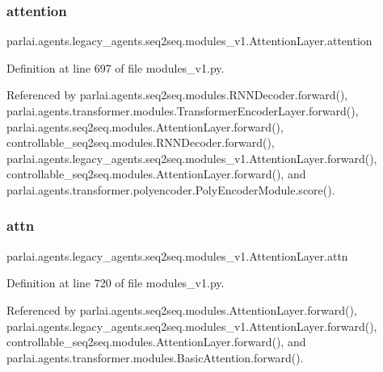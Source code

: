 \subsubsection{\texorpdfstring{attention}{attention}}
{\footnotesize\ttfamily parlai.\+agents.\+legacy\+\_\+agents.\+seq2seq.\+modules\+\_\+v1.\+Attention\+Layer.\+attention}



Definition at line 697 of file modules\+\_\+v1.\+py.



Referenced by parlai.\+agents.\+seq2seq.\+modules.\+R\+N\+N\+Decoder.\+forward(), parlai.\+agents.\+transformer.\+modules.\+Transformer\+Encoder\+Layer.\+forward(), parlai.\+agents.\+seq2seq.\+modules.\+Attention\+Layer.\+forward(), controllable\+\_\+seq2seq.\+modules.\+R\+N\+N\+Decoder.\+forward(), parlai.\+agents.\+legacy\+\_\+agents.\+seq2seq.\+modules\+\_\+v1.\+Attention\+Layer.\+forward(), controllable\+\_\+seq2seq.\+modules.\+Attention\+Layer.\+forward(), and parlai.\+agents.\+transformer.\+polyencoder.\+Poly\+Encoder\+Module.\+score().

\mbox{\label{classparlai_1_1agents_1_1legacy__agents_1_1seq2seq_1_1modules__v1_1_1AttentionLayer_aa9eaecc56fcf6d7816fe23d0c27dd481}} 
\subsubsection{\texorpdfstring{attn}{attn}}
{\footnotesize\ttfamily parlai.\+agents.\+legacy\+\_\+agents.\+seq2seq.\+modules\+\_\+v1.\+Attention\+Layer.\+attn}



Definition at line 720 of file modules\+\_\+v1.\+py.



Referenced by parlai.\+agents.\+seq2seq.\+modules.\+Attention\+Layer.\+forward(), parlai.\+agents.\+legacy\+\_\+agents.\+seq2seq.\+modules\+\_\+v1.\+Attention\+Layer.\+forward(), controllable\+\_\+seq2seq.\+modules.\+Attention\+Layer.\+forward(), and parlai.\+agents.\+transformer.\+modules.\+Basic\+Attention.\+forward().


